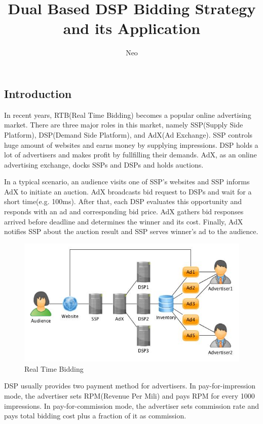 \documentclass{article}
\theoremstyle{definition}
\begin{document}
\begin{CJK}{UTF8}{gbsn}

\title{Dual Based DSP Bidding Strategy and its Application}
\author{Neo}
\maketitle
\newpage

\tableofcontents
\newpage

\section{Introduction}

In recent years, RTB(Real Time Bidding) becomes a popular online advertising market.
There are three major roles in this market, namely SSP(Supply Side Platform), DSP(Demand Side Platform), and AdX(Ad Exchange).
SSP controls huge amount of websites and earns money by supplying impressions.
DSP holds a lot of advertisers and makes profit by fullfilling their demands.
AdX, as an online advertising exchange, docks SSPs and DSPs and holds auctions.

In a typical scenario, an audience visits one of SSP's websites and SSP informs AdX to initiate an auction.
AdX broadcasts bid request to DSPs and wait for a short time(e.g. 100ms).
After that, each DSP evaluates this opportunity and responds with an ad and corresponding bid price.
AdX gathers bid responses arrived before deadline and determines the winner and its cost.
Finally, AdX notifies SSP about the auction result and SSP serves winner's ad to the audience.

\begin{figure}[!h]
\centering
\includegraphics[width=0.6\linewidth]{./DSP.jpg}
\caption{Real Time Bidding}
\end{figure}

DSP usually provides two payment method for advertisers.
In pay-for-impression mode, the advertiser sets RPM(Revenue Per Mili) and pays RPM for every 1000 impressions.
In pay-for-commission mode, the advertiser sets commission rate and pays total bidding cost plus a fraction of it as commission.


\end{CJK}
\end{document}
